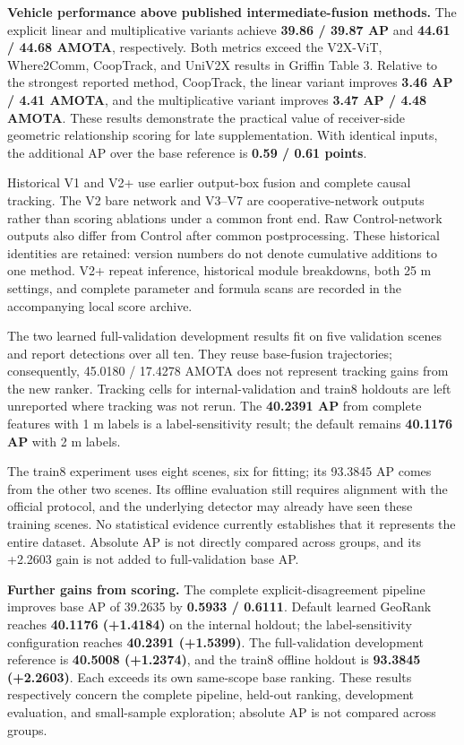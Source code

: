 \textbf{Vehicle performance above published intermediate-fusion methods.} The explicit linear and multiplicative variants achieve \textbf{39.86 / 39.87 AP} and \textbf{44.61 / 44.68 AMOTA}, respectively. Both metrics exceed the V2X-ViT, Where2Comm, CoopTrack, and UniV2X results in Griffin Table 3. Relative to the strongest reported method, CoopTrack, the linear variant improves \textbf{3.46 AP / 4.41 AMOTA}, and the multiplicative variant improves \textbf{3.47 AP / 4.48 AMOTA}. These results demonstrate the practical value of receiver-side geometric relationship scoring for late supplementation. With identical inputs, the additional AP over the base reference is \textbf{0.59 / 0.61 points}.

Historical V1 and V2+ use earlier output-box fusion and complete causal tracking. The V2 bare network and V3--V7 are cooperative-network outputs rather than scoring ablations under a common front end. Raw Control-network outputs also differ from Control after common postprocessing. These historical identities are retained: version numbers do not denote cumulative additions to one method. V2+ repeat inference, historical module breakdowns, both 25 m settings, and complete parameter and formula scans are recorded in the accompanying local score archive.

The two learned full-validation development results fit on five validation scenes and report detections over all ten. They reuse base-fusion trajectories; consequently, 45.0180 / 17.4278 AMOTA does not represent tracking gains from the new ranker. Tracking cells for internal-validation and train8 holdouts are left unreported where tracking was not rerun. The \textbf{40.2391 AP} from complete features with 1 m labels is a label-sensitivity result; the default remains \textbf{40.1176 AP} with 2 m labels.

The train8 experiment uses eight scenes, six for fitting; its 93.3845 AP comes from the other two scenes. Its offline evaluation still requires alignment with the official protocol, and the underlying detector may already have seen these training scenes. No statistical evidence currently establishes that it represents the entire dataset. Absolute AP is not directly compared across groups, and its +2.2603 gain is not added to full-validation base AP.

\textbf{Further gains from scoring.} The complete explicit-disagreement pipeline improves base AP of 39.2635 by \textbf{0.5933 / 0.6111}. Default learned GeoRank reaches \textbf{40.1176 (+1.4184)} on the internal holdout; the label-sensitivity configuration reaches \textbf{40.2391 (+1.5399)}. The full-validation development reference is \textbf{40.5008 (+1.2374)}, and the train8 offline holdout is \textbf{93.3845 (+2.2603)}. Each exceeds its own same-scope base ranking. These results respectively concern the complete pipeline, held-out ranking, development evaluation, and small-sample exploration; absolute AP is not compared across groups.

